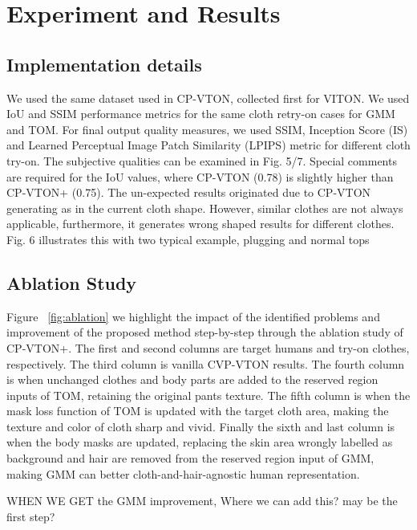 
\section{Experiment and Results} 

\subsection{Implementation details} 

We used the same dataset used in CP-VTON, collected first for VITON. We used IoU and SSIM performance metrics for the same cloth retry-on cases for GMM and TOM. For final output quality measures, we used SSIM, Inception Score (IS)\cite{salimans2016improved} and Learned Perceptual Image Patch Similarity (LPIPS) metric \cite{zhang2018unreasonable} for different cloth try-on. The subjective qualities can be examined in Fig. 5/7.  Special comments are required for the IoU values, where CP-VTON (0.78) is slightly higher than CP-VTON+ (0.75). The un-expected results originated due to CP-VTON generating as in the current cloth shape. However, similar clothes are not always applicable, furthermore, it generates wrong shaped results for different clothes. Fig. 6 illustrates this with two typical example, plugging and normal tops


\subsection{Ablation Study}

Figure ~\ref{fig:ablation} we highlight the impact of the identified problems and improvement of the proposed method step-by-step through the ablation study of CP-VTON+. The first and second columns are target humans and try-on clothes, respectively. The third column is vanilla CVP-VTON results. The fourth column is when unchanged clothes and body parts are added to the reserved region inputs of TOM, retaining the original pants texture. The fifth column is when the mask loss function of TOM is updated with the target cloth area, making the texture and color of cloth sharp and vivid. Finally the sixth and last column is when the body masks are updated, replacing the skin area wrongly labelled as background and hair are removed from the reserved region input of GMM, making GMM can better cloth-and-hair-agnostic human representation.  

WHEN WE GET the GMM improvement, Where we can add this? may be the first step?

